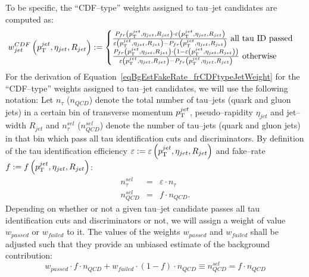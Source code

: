 To be specific, the ``CDF--type'' weights assigned to tau--jet candidates are
computed as:
\begin{equation}
w_{jet}^{CDF} \left( p_{\mathrm{T}}^{jet}, \eta_{jet}, R_{jet} \right) 
:= 
\begin{cases} 
   \frac{P_{fr} \left( p_{\mathrm{T}}^{jet}, \eta_{jet}, R_{jet} \right) \cdot 
         \varepsilon \left( p_{\mathrm{T}}^{jet}, \eta_{jet}, R_{jet} \right)}
        {\varepsilon \left( p_{\mathrm{T}}^{jet}, \eta_{jet}, R_{jet} \right) - P_{fr} \left( p_{\mathrm{T}}^{jet}, \eta_{jet}, R_{jet} \right)}~\mbox{all tau ID passed} \\
   \frac{P_{fr} \left( p_{\mathrm{T}}^{jet}, \eta_{jet}, R_{jet} \right) \cdot 
         \left( 1 - \varepsilon \left( p_{\mathrm{T}}^{jet}, \eta_{jet}, R_{jet} \right) \right)}
        {\varepsilon \left( p_{\mathrm{T}}^{jet}, \eta_{jet}, R_{jet} \right) - P_{fr} \left( p_{\mathrm{T}}^{jet}, \eta_{jet}, R_{jet} \right)}~\mbox{otherwise}
\end{cases}
\label{eqBgEstFakeRate_frCDFtypeJetWeight}
\end{equation}
For the derivation of Equation~\ref{eqBgEstFakeRate_frCDFtypeJetWeight} for the
``CDF--type'' weights assigned to tau--jet candidates, we will use the following
notation: Let $n_{\tau}$ ($n_{QCD}$) denote the total number of tau--jets (quark
and gluon jets) in a certain bin of transverse momentum $p_{\mathrm{T}}^{jet}$,
pseudo--rapidity $\eta_{jet}$ and jet--width $R_{jet}$ and $n_{\tau}^{sel}$
($n_{QCD}^{sel}$) denote the number of tau--jets (quark and gluon jets) in that
bin which pass all tau identification cuts and discriminators.
By definition of the tau identification efficiency $\varepsilon := \varepsilon
\left( p_{\mathrm{T}}^{jet}, \eta_{jet}, R_{jet} \right)$ and fake--rate $f := f \left(
p_{\mathrm{T}}^{jet}, \eta_{jet}, R_{jet} \right)$:
\begin{eqnarray}
n_{\tau}^{sel} & = & \varepsilon \cdot n_{\tau} \nonumber \\
n_{QCD}^{sel} & = & f \cdot n_{QCD}.
\label{eqBgEstFakeRate_eff_and_frDef}
\end{eqnarray}
Depending on whether or not a given tau--jet candidate passes all tau
identification cuts and discriminators or not, we will assign a weight of value
$w_{passed}$ or $w_{failed}$ to it.
The values of the weights $w_{passed}$ and $w_{failed}$ shall be adjusted such
that they provide an unbiased estimate of the background contribution:
\begin{equation}
w_{passed} \cdot f \cdot n_{QCD} + w_{failed} \cdot \left( 1 - f \right) \cdot n_{QCD} \equiv n_{QCD}^{sel} = f \cdot n_{QCD}
\label{eqBgEstFakeRate_QCD}
\end{equation}
